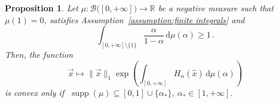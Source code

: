 \documentclass[aps,pra,11pt,onecolumn,nofootinbib,tightenlines]{revtex4-2}
\newtheorem{proposition}[theorem]{Proposition}
\theoremstyle{definition}
\def \d {\mathrm{d}}
\newcommand{\mc}[1]{\mathcal{#1}}
\newcommand{\mb}[1]{\mathbb{#1}}
\begin{document}
\begin{proposition}
\label{prop: third prop measure}
Let $\mu:\mc B\big([0,+\infty]\big)\to\mb R$ be a negative measure such that $\mu(1)=0$, satisfies Assumption~\ref{assumption:finite integrals} and
\begin{equation}
\label{eq: cond on beta0}
   \int_{[0,+\infty]\setminus\{1\}} \frac{\alpha}{1-\alpha} \,\d\mu(\alpha) \geq 1 \,.
\end{equation}
Then, the function
\begin{equation}
    \vec{x} \longmapsto \|\vec{x}\|_1 \exp\left( \int_{[0,+\infty]} H_\alpha(\hat{x}) \,\d\mu(\alpha) \right)
\end{equation}
    is convex only if $\;\operatorname{supp}(\mu) \subseteq [0,1] \cup \{\alpha_*\}$, $\alpha_* \in [1, +\infty]$.
\end{proposition}
\end{document}
